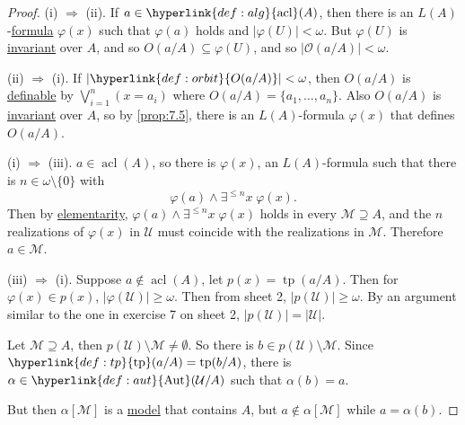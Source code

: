 \documentclass{article}
\DeclareMathOperator{\Aut}{Aut}
\DeclareMathOperator{\tp}{tp}
\DeclareMathOperator{\acl}{acl}
\begin{document}
\begin{proof}
  (i) $\Rightarrow$ (ii). If $a \in \hyperlink{def:alg}{\acl}(A)$, then there is an \hyperlink{def:la}{$L(A)$}-\hyperlink{def:form}{formula} $\varphi(x)$ such that $\varphi(a)$ holds and $|\varphi(U)| < \omega$.
  But $\varphi(U)$ is \hyperlink{def:inv}{invariant} over $A$, and so $O(a/A) \subseteq \varphi(U)$, and so $|\mathcal{O}(a/A)| < \omega$.

  (ii) $\Rightarrow$ (i). If $|\hyperlink{def:orbit}{O(a/A)}| < \omega$, then $O(a/A)$ is \hyperlink{def:def}{definable} by $\bigvee_{i=1}^n (x = a_i)$ where $O(a/A) = \{a_1, \dotsc, a_n\}$.
  Also $O(a/A)$ is \hyperlink{def:inv}{invariant} over $A$, so by \cref{prop:7.5}, there is an $L(A)$-formula $\varphi(x)$ that defines $O(a/A)$.

  (i) $\Rightarrow$ (iii). $a \in \acl(A)$, so there is $\varphi(x)$, an $L(A)$-formula such that there is $n \in \omega\setminus\{0\}$ with
  \begin{equation*}
    \varphi(a) \wedge \exists^{\leq n} x \; \varphi(x).
  \end{equation*}
  Then by \hyperlink{def:elmap}{elementarity}, $\varphi(a) \wedge \exists^{\leq n} x \; \varphi(x)$ holds in every $\mathcal{M} \supseteq A$, and the $n$ realizations of $\varphi(x)$ in $\mathcal{U}$ must coincide with the realizations in $\mathcal{M}$.
  Therefore $a \in \mathcal{M}$.

  (iii) $\Rightarrow$ (i). Suppose $a \notin \acl(A)$, let $p(x) = \tp(a/A)$. Then for $\varphi(x) \in p(x)$, $|\varphi(\mathcal{U})| \geq \omega$.
  Then from sheet 2, $|p(\mathcal{U})| \geq \omega$.
  By an argument similar to the one in exercise 7 on sheet 2, $|p(\mathcal{U})| = |\mathcal{U}|$.

  Let $\mathcal{M} \supseteq A$, then $p(\mathcal{U}) \setminus \mathcal{M} \neq \emptyset$.
  So there is $b \in p(\mathcal{U}) \setminus \mathcal{M}$.
  Since $\hyperlink{def:tp}{\tp}(a/A) = \tp(b/A)$, there is $\alpha \in \hyperlink{def:aut}{\Aut}(\mathcal{U}/A)$ such that $\alpha(b) = a$.

  But then $\alpha[\mathcal{M}]$ is a \hyperlink{def:model}{model} that contains $A$, but $a \notin \alpha[\mathcal{M}]$ while $a = \alpha(b)$.
\end{proof}
\end{document}
